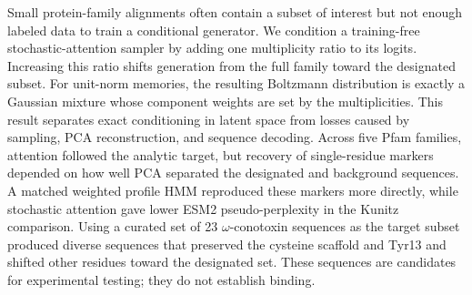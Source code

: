 Small protein-family alignments often contain a subset of interest but not enough labeled data
to train a conditional generator. We condition a training-free stochastic-attention sampler by
adding one multiplicity ratio to its logits. Increasing this ratio shifts generation from the
full family toward the designated subset. For unit-norm memories, the resulting Boltzmann
distribution is exactly a Gaussian mixture whose component weights are set by the
multiplicities. This result separates exact conditioning in latent space from losses caused by
sampling, PCA reconstruction, and sequence decoding. Across five Pfam families, attention
followed the analytic target, but recovery of single-residue markers depended on how well PCA
separated the designated and background sequences. A matched weighted profile HMM reproduced
these markers more directly, while stochastic attention gave lower ESM2 pseudo-perplexity in
the Kunitz comparison. Using a curated set of 23 $\omega$-conotoxin sequences as the target subset
produced diverse sequences that preserved the cysteine scaffold and Tyr13 and shifted other
residues toward the designated set. These sequences are candidates for experimental testing;
they do not establish binding.

